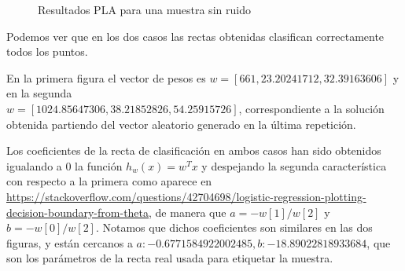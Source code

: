 \documentclass[a4]{article}
\begin{document}
\begin{figure}[H]
	\centering    
	\caption{Resultados PLA para una muestra sin ruido}
	\label{fig:PLA1}
\end{figure}

Podemos ver que en los dos casos las rectas obtenidas clasifican correctamente todos los puntos.

En la primera figura el vector de pesos es $ w=[661, 23.20241712, 32.39163606] $ y en la segunda\\ $w=[1024.85647306, 38.21852826, 54.25915726]$, correspondiente a la solución obtenida partiendo del vector aleatorio generado en la última repetición. 

Los coeficientes de la recta de clasificación en ambos casos han sido obtenidos igualando a 0 la función $h_w(x)=w^Tx$ y despejando la segunda característica con respecto a la primera como aparece en \href{https://stackoverflow.com/questions/42704698/logistic-regression-plotting-decision-boundary-from-theta}{https://stackoverflow.com/questions/42704698/logistic-regression-plotting-decision-boundary-from-theta}, de manera que $a=-w[1]/w[2]$ y $b=-w[0]/w[2]$. Notamos que dichos coeficientes son similares en las dos figuras, y están cercanos a $ a:  -0.6771584922002485,  b: -18.89022818933684 $, que son los parámetros de la recta real usada para etiquetar la muestra.  
\end{document}
